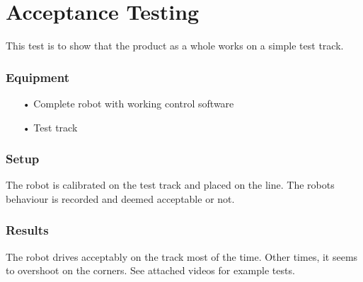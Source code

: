 \section{Acceptance Testing}
This test is to show that the product as a whole works on a simple test track.

\subsubsection{Equipment}
\begin{enumerate}
	\item[•]Complete robot with working control software
	\item[•]Test track
\end{enumerate}

\subsubsection{Setup}
The robot is calibrated on the test track and placed on the line. The robots behaviour is recorded and deemed acceptable or not.

\subsubsection{Results}
The robot drives acceptably on the track most of the time. Other times, it seems to overshoot on the corners. See attached videos for example tests.





